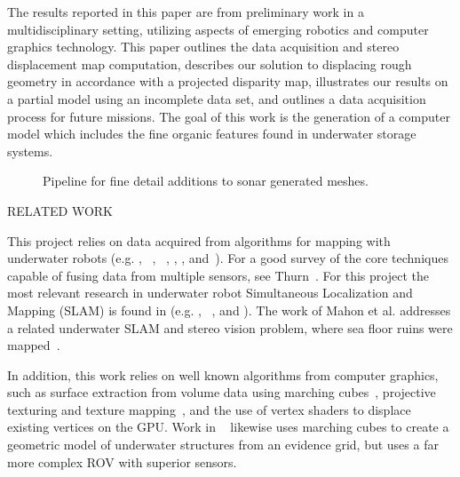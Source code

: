 \documentclass[twocolumn]{article}
\makeatletter
\def\section{\@startsection{section}{1}{\z@}{24pt plus 2 pt
minus 2 pt} {12pt plus 2pt minus 2pt}{\large\bf}}
\makeatother
\begin{document}
The results reported in this paper are from preliminary work in a multidisciplinary setting, utilizing aspects of emerging robotics and computer graphics technology. This paper outlines the data acquisition and stereo displacement map computation, describes our solution to displacing rough geometry in accordance with a projected disparity map, illustrates our results on a partial model using an incomplete data set, and outlines a data acquisition process for future missions. The goal of this work is the generation of a computer model which includes the fine organic features found in underwater storage systems.

\begin{figure*}[!ht]
  \vspace{-0.2cm}
  \caption{Pipeline for fine detail additions to sonar generated meshes.}
 \label{fig:systemblock}
\end{figure*}

\section{\uppercase{Related Work}}
\label{sec:data}

This project relies on data acquired from algorithms for mapping with underwater robots (e.g. \cite{Williams2000}, ~\cite{Williams09}, ~\cite{opizarro-2009a}, \cite{Fairfield2005,Fairfield2006}, \cite{Clark2008b}, and~\cite{White10}). For a good survey of the core techniques capable of fusing data from multiple sensors, see Thurn~\cite{Thrun2005}.
For this project the most relevant  research in underwater robot Simultaneous Localization and Mapping (SLAM) is found in (e.g. \cite{Williams2000}, ~\cite{harbor}, and \cite{Fairfield2005,Fairfield2006}).  
The work of Mahon et al. addresses a related underwater SLAM and stereo vision problem, where sea floor ruins were mapped~\cite{Mahon:2011}.

In addition, this work relies on well known algorithms from computer graphics, such as surface extraction from volume data using marching cubes~\cite{Lorensen}, projective texturing and texture mapping~\cite{Williams78castingcurved,Segal}, and the use of vertex shaders to displace existing vertices on the GPU. Work in ~\cite{Fairfield:2010} likewise uses marching cubes to create a geometric model of underwater structures from an evidence grid, but uses a far more complex ROV with superior sensors.
\end{document}
